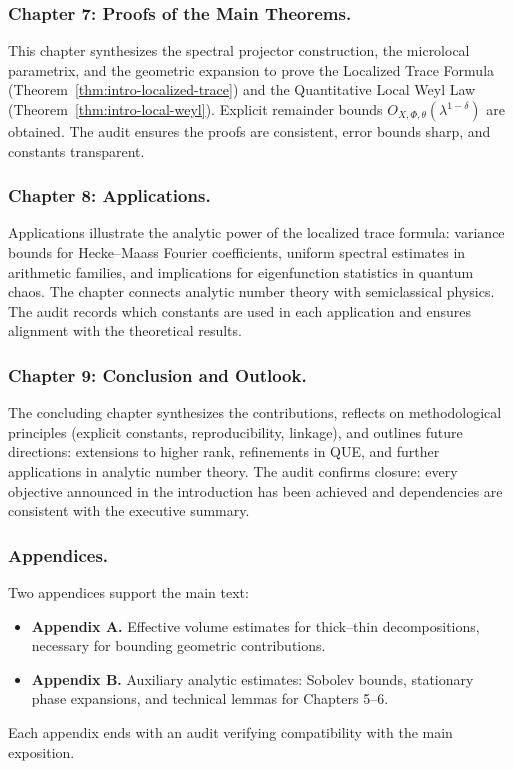 \subsubsection*{Chapter 7: Proofs of the Main Theorems.}
This chapter synthesizes the spectral projector construction, the microlocal parametrix,
and the geometric expansion to prove
the Localized Trace Formula (Theorem~\ref{thm:intro-localized-trace})
and the Quantitative Local Weyl Law (Theorem~\ref{thm:intro-local-weyl}).
Explicit remainder bounds $O_{X,\Phi,\theta}(\lambda^{1-\delta})$ are obtained.
The audit ensures the proofs are consistent,
error bounds sharp, and constants transparent.

\subsubsection*{Chapter 8: Applications.}
Applications illustrate the analytic power of the localized trace formula:
variance bounds for Hecke–Maass Fourier coefficients,
uniform spectral estimates in arithmetic families,
and implications for eigenfunction statistics in quantum chaos.
The chapter connects analytic number theory with semiclassical physics.
The audit records which constants are used in each application
and ensures alignment with the theoretical results.

\subsubsection*{Chapter 9: Conclusion and Outlook.}
The concluding chapter synthesizes the contributions,
reflects on methodological principles (explicit constants, reproducibility, linkage),
and outlines future directions:
extensions to higher rank,
refinements in QUE,
and further applications in analytic number theory.
The audit confirms closure: every objective announced in the introduction
has been achieved and dependencies are consistent with the executive summary.

\subsubsection*{Appendices.}
Two appendices support the main text:
\begin{itemize}
  \item \textbf{Appendix A.} Effective volume estimates for thick–thin decompositions,
        necessary for bounding geometric contributions.
  \item \textbf{Appendix B.} Auxiliary analytic estimates:
        Sobolev bounds, stationary phase expansions,
        and technical lemmas for Chapters 5–6.
\end{itemize}
Each appendix ends with an audit verifying compatibility with the main exposition.

